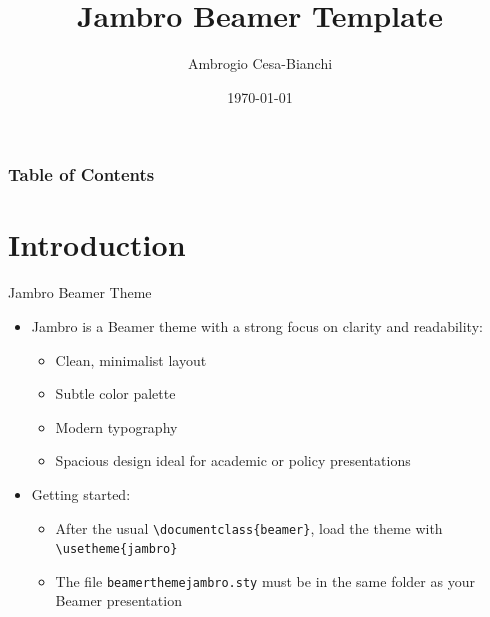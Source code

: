 \documentclass[10pt,itemsep]{beamer}
\title[]{Jambro Beamer Template}
\author[]{Ambrogio Cesa-Bianchi}
\date{\today}
\begin{document}
 
\begin{frame}[plain]
\end{frame} 

\begin{frame}
    \frametitle{Table of Contents}
    \tableofcontents
\end{frame}

\section{Introduction}
\begin{frame}{Jambro Beamer Theme}
    \small
    \begin{itemize}
        \item Jambro is a Beamer theme with a strong focus on clarity and readability:
        \begin{itemize}
            \item Clean, minimalist layout
            \item Subtle color palette
            \item Modern typography
            \item Spacious design ideal for academic or policy presentations 
        \end{itemize}
        \item Getting started:
        \begin{itemize}
            \item After the usual \texttt{\textbackslash documentclass\{beamer\}}, load the theme with \texttt{\textbackslash usetheme\{jambro\}}
            \item The file \texttt{beamerthemejambro.sty} must be in the same folder as your Beamer presentation
        \end{itemize}
    \end{itemize}
\end{frame}
\shownotesblock{}
\end{document}
